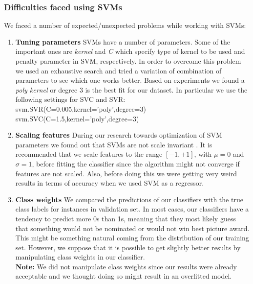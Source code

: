 \documentclass[journal,transmag]{IEEEtran}
\begin{document}
\subsubsection{Difficulties faced using SVMs}
\label{svm}
We faced a number of expected/unexpected problems while working with SVMs:
\begin{enumerate}
\item{\textbf{Tuning parameters}} SVMs have a number of parameters. Some of the important ones are \emph{kernel} and \emph{C} which specify type of kernel to be used and penalty parameter in SVM, respectively. In order to overcome this problem we used an exhaustive search and tried a variation of combination of parameters to see which one works better. Based on experiments we found a \textit{poly kernel} or degree 3 is the best fit for our dataset. In particular we use the following settings for SVC and SVR:\\
svm.SVR(C=0.005,kernel='poly',degree=3)\\
svm.SVC(C=1.5,kernel='poly',degree=3)

\item{\textbf{Scaling features}} During our research towards optimization of SVM parameters we found out that SVMs are not scale invariant \cite{ref6}. It is recommended that we scale features to the range $[-1, +1]$, with $\mu = 0$ and $\sigma = 1$, before fitting the classifier since the algorithm might not converge if features are not scaled. Also, before doing this we were getting very weird results in terms of accuracy when we used SVM as a regressor.

\item{\textbf{Class weights} We compared the predictions of our classifiers with the true class labels for instances in validation set. In most cases, our classifiers have a tendency to predict more 0s than 1s, m}eaning that they most likely guess that something would not be nominated or would not win best picture award. This might be something natural coming from the distribution of our training set. However, we suppose that it is possible to get slightly better results by manipulating class weights in our classifier.\\
\textbf{Note:} We did not manipulate class weights since our results were already acceptable and we thought doing so might result in an overfitted model.
\end{enumerate}

			
\end{document}
